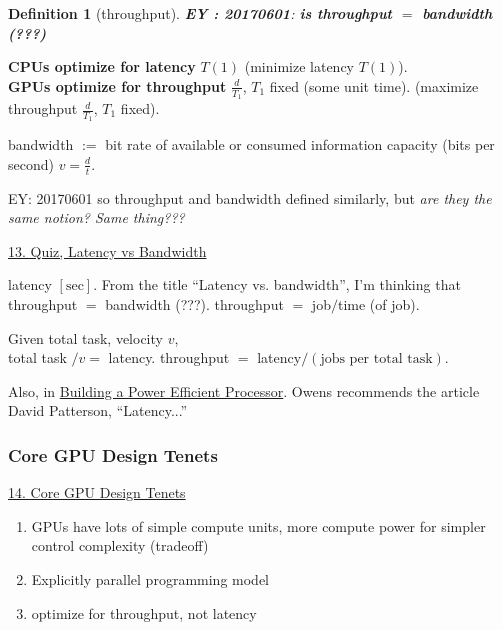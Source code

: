 \documentclass[10pt]{amsart}
\newtheorem{definition}{Definition}
\begin{document}
\begin{multicols*}{2}
\begin{definition}[throughput]
\textbf{EY : 20170601}: \textbf{ is throughput $=$ bandwidth (???) }
\end{definition}

\textbf{CPUs optimize for latency} $T(1)$ (minimize latency $T(1)$).   \\

\textbf{GPUs optimize for throughput} $\frac{d}{T_1}$, $T_1$ fixed (some unit time).  (maximize throughput $\frac{d}{T_1}$, $T_1$ fixed).  

bandwidth $:=$ bit rate of available or consumed information capacity (bits per second) $v=\frac{d}{t}$.  

EY: 20170601 so throughput and bandwidth defined similarly, but \emph{are they the same notion?  Same thing???}





\href{https://classroom.udacity.com/courses/cs344/lessons/55120467/concepts/667559300923}{13. Quiz, Latency vs Bandwidth}

latency $[\text{sec}]$.  From the title ``Latency vs. bandwidth'', I'm thinking that throughput $=$ bandwidth (???).  throughput $ = $ job$/$time (of job).  

Given total task, velocity $v$, \\
total task $/v = $ latency.  throughput $=$ latency$/(\text{jobs per total task})$.  


Also, in \href{https://classroom.udacity.com/courses/cs344/lessons/55120467/concepts/669874580923}{Building a Power Efficient Processor}.  Owens recommends the article David Patterson, ``Latency...''

\subsubsection{Core GPU Design Tenets}

\href{https://classroom.udacity.com/courses/cs344/lessons/55120467/concepts/671181620923}{14. Core GPU Design Tenets}

\begin{enumerate}
\item GPUs have lots of simple compute units, more compute power for simpler control complexity (tradeoff) 
\item Explicitly parallel programming model
\item optimize for throughput, not latency 
\end{enumerate}





\end{multicols*}
\end{document}
